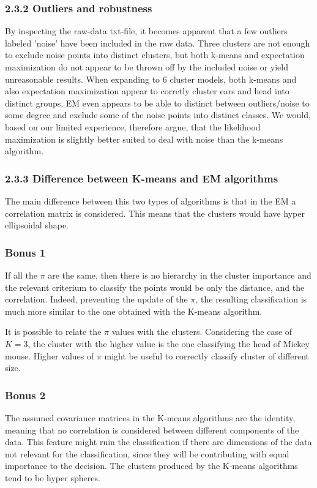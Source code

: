\subsubsection*{2.3.2 Outliers and robustness}
By inspecting the raw-data txt-file, it becomes apparent that a few outliers labeled 'noise' have been included in the raw data. Three clusters are not enough to exclude noise points into distinct clusters, but both k-means and expectation maximization do not appear to be thrown off by the included noise or yield unreasonable results. When expanding to 6 cluster models, both k-means and also expectation maximization appear to corretly cluster ears and head into distinct groups. EM even appears to be able to distinct between outliers/noise to some degree and exclude some of the noise points into distinct classes. We would, based on our limited experience, therefore argue, that the likelihood maximization is slightly better suited to deal with noise than the k-means algorithm.


\subsubsection*{2.3.3 Difference between K-means and EM algorithms}
The main difference between this two types of algorithms is that in the EM a correlation matrix is considered. This means that the clusters would have hyper ellipsoidal shape. 


\subsubsection*{Bonus 1}
If all the $\pi$ are the same, then there is no hierarchy in the cluster importance and the relevant criterium to classify the points would be only the distance, and the correlation. Indeed, preventing the update of the $\pi$, the resulting classification is much more similar to the one obtained with the K-means algorithm. 

It is possible to relate the $\pi$ values with the clusters. Considering the case of $K=3$, the cluster with the higher value is the one classifying the head of Mickey mouse. 
Higher values of $\pi$ might be useful to correctly classify cluster of different size. 


\subsubsection*{Bonus 2}
The assumed covariance matrices in the K-means algorithms are the identity, meaning that no correlation is considered between different components of the data. This feature might ruin the classification if there are dimensions of the data not relevant for the classification, since they will be contributing with equal importance to the decision. 
The clusters produced by the K-means algorithms tend to be hyper spheres. 
